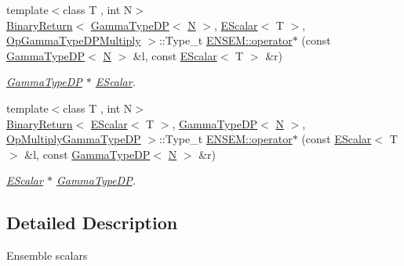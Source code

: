 \begin{DoxyCompactItemize}
{\footnotesize template$<$class T , int N$>$ }\\\mbox{\hyperlink{structENSEM_1_1BinaryReturn}{Binary\+Return}}$<$ \mbox{\hyperlink{classENSEM_1_1GammaTypeDP}{Gamma\+Type\+DP}}$<$ \mbox{\hyperlink{adat__devel_2lib_2hadron_2operator__name__util_8cc_a7722c8ecbb62d99aee7ce68b1752f337}{N}} $>$, \mbox{\hyperlink{classENSEM_1_1EScalar}{E\+Scalar}}$<$ T $>$, \mbox{\hyperlink{structENSEM_1_1OpGammaTypeDPMultiply}{Op\+Gamma\+Type\+D\+P\+Multiply}} $>$\+::Type\+\_\+t \mbox{\hyperlink{group__escalar_ga54ffca46c333d9dad30043eb6cef6299}{E\+N\+S\+E\+M\+::operator$\ast$}} (const \mbox{\hyperlink{classENSEM_1_1GammaTypeDP}{Gamma\+Type\+DP}}$<$ \mbox{\hyperlink{adat__devel_2lib_2hadron_2operator__name__util_8cc_a7722c8ecbb62d99aee7ce68b1752f337}{N}} $>$ \&l, const \mbox{\hyperlink{classENSEM_1_1EScalar}{E\+Scalar}}$<$ T $>$ \&r)
\begin{DoxyCompactList}\small\item\em \mbox{\hyperlink{classENSEM_1_1GammaTypeDP}{Gamma\+Type\+DP}} $\ast$ \mbox{\hyperlink{classENSEM_1_1EScalar}{E\+Scalar}}. \end{DoxyCompactList}\item 
{\footnotesize template$<$class T , int N$>$ }\\\mbox{\hyperlink{structENSEM_1_1BinaryReturn}{Binary\+Return}}$<$ \mbox{\hyperlink{classENSEM_1_1EScalar}{E\+Scalar}}$<$ T $>$, \mbox{\hyperlink{classENSEM_1_1GammaTypeDP}{Gamma\+Type\+DP}}$<$ \mbox{\hyperlink{adat__devel_2lib_2hadron_2operator__name__util_8cc_a7722c8ecbb62d99aee7ce68b1752f337}{N}} $>$, \mbox{\hyperlink{structENSEM_1_1OpMultiplyGammaTypeDP}{Op\+Multiply\+Gamma\+Type\+DP}} $>$\+::Type\+\_\+t \mbox{\hyperlink{group__escalar_ga546f1e55f2e4eda7a887fbf4fcaa177f}{E\+N\+S\+E\+M\+::operator$\ast$}} (const \mbox{\hyperlink{classENSEM_1_1EScalar}{E\+Scalar}}$<$ T $>$ \&l, const \mbox{\hyperlink{classENSEM_1_1GammaTypeDP}{Gamma\+Type\+DP}}$<$ \mbox{\hyperlink{adat__devel_2lib_2hadron_2operator__name__util_8cc_a7722c8ecbb62d99aee7ce68b1752f337}{N}} $>$ \&r)
\begin{DoxyCompactList}\small\item\em \mbox{\hyperlink{classENSEM_1_1EScalar}{E\+Scalar}} $\ast$ \mbox{\hyperlink{classENSEM_1_1GammaTypeDP}{Gamma\+Type\+DP}}. \end{DoxyCompactList}\end{DoxyCompactItemize}


\subsection{Detailed Description}
Ensemble scalars 

